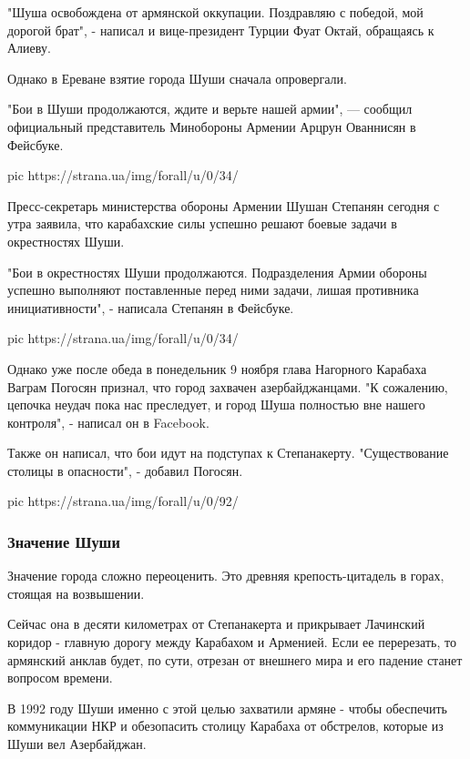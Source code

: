 "Шуша освобождена от армянской оккупации. Поздравляю с победой, мой дорогой
брат", - написал и вице-президент Турции Фуат Октай, обращаясь к Алиеву.

Однако в Ереване взятие города Шуши сначала опровергали. 

"Бои в Шуши продолжаются, ждите и верьте нашей армии", — сообщил официальный
представитель Минобороны Армении Арцрун Ованнисян в Фейсбуке.

\ifcmt
pic https://strana.ua/img/forall/u/0/34/%
\fi

Пресс-секретарь министерства обороны Армении Шушан Степанян сегодня с утра
заявила, что карабахские силы успешно решают боевые задачи в окрестностях Шуши.

"Бои в окрестностях Шуши продолжаются. Подразделения Армии обороны успешно
выполняют поставленные перед ними задачи, лишая противника инициативности", -
написала Степанян в Фейсбуке.

\ifcmt
pic https://strana.ua/img/forall/u/0/34/%
\fi

Однако уже после обеда в понедельник 9 ноября глава Нагорного Карабаха Ваграм
Погосян признал, что город захвачен азербайджанцами. "К сожалению, цепочка
неудач пока нас преследует, и город Шуша полностью вне нашего контроля", -
написал он в Facebook.

Также он написал, что бои идут на подступах к Степанакерту. "Существование
столицы в опасности", - добавил Погосян.

\ifcmt
pic https://strana.ua/img/forall/u/0/92/%
\fi

\subsubsection{Значение Шуши}

Значение города сложно переоценить. Это древняя крепость-цитадель в горах,
стоящая на возвышении.

Сейчас она в десяти километрах от Степанакерта и прикрывает Лачинский коридор -
главную дорогу между Карабахом и Арменией. Если ее перерезать, то армянский
анклав будет, по сути, отрезан от внешнего мира и его падение станет вопросом
времени. 

В 1992 году Шуши именно с этой целью захватили армяне - чтобы обеспечить
коммуникации НКР и обезопасить столицу Карабаха от обстрелов, которые из Шуши
вел Азербайджан.

